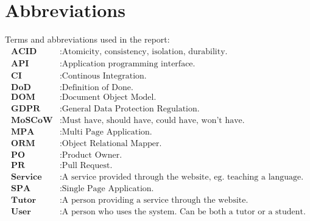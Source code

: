 \chapter*{Abbreviations}
Terms and abbreviations used in the report:
\begin{align*}
    \textbf{ACID} &: \text{Atomicity, consistency, isolation, durability.} \\
    \textbf{API} &: \text{Application programming interface.} \\
    \textbf{CI} &: \text{Continous Integration.} \\
    \textbf{DoD} &: \text{Definition of Done.} \\
    \textbf{DOM} &: \text{Document Object Model.} \\
    \textbf{GDPR} &: \text{General Data Protection Regulation.} \\
    \textbf{MoSCoW} &: \text{Must have, should have, could have, won't have.} \\
    \textbf{MPA} &: \text{Multi Page Application.} \\
    \textbf{ORM} &: \text{Object Relational Mapper.} \\
    \textbf{PO} &: \text{Product Owner.} \\
    \textbf{PR} &: \text{Pull Request.} \\
    \textbf{Service} &: \text{A service provided through the website, eg. teaching a language.} \\
    \textbf{SPA} &: \text{Single Page Application.} \\
    \textbf{Tutor} &: \text{A person providing a service through the website.} \\
    \textbf{User} &: \text{A person who uses the system. Can be both a tutor or a student.} \\
\end{align*}
